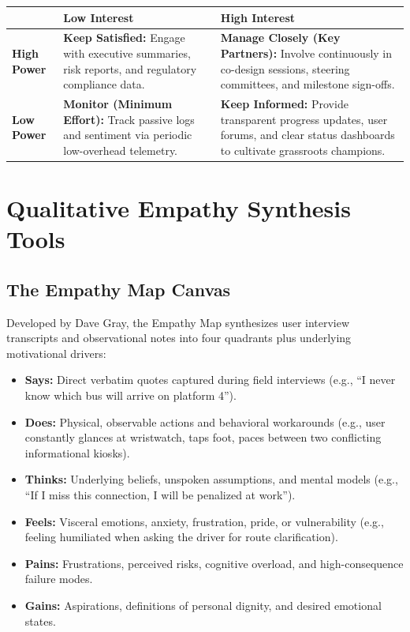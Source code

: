 \begin{methodbox}
\begin{tabularx}{\linewidth}{|l|X|X|} \hline
 & \textbf{Low Interest} & \textbf{High Interest} \\ \hline
\textbf{High Power} & \textbf{Keep Satisfied:} Engage with executive summaries, risk reports, and regulatory compliance data. & \textbf{Manage Closely (Key Partners):} Involve continuously in co-design sessions, steering committees, and milestone sign-offs. \\ \hline
\textbf{Low Power} & \textbf{Monitor (Minimum Effort):} Track passive logs and sentiment via periodic low-overhead telemetry. & \textbf{Keep Informed:} Provide transparent progress updates, user forums, and clear status dashboards to cultivate grassroots champions. \\ \hline
\end{tabularx}
\end{methodbox}

\section{Qualitative Empathy Synthesis Tools}

\subsection{The Empathy Map Canvas}
Developed by Dave Gray, the Empathy Map synthesizes user interview transcripts and observational notes into four quadrants plus underlying motivational drivers:
\begin{itemize}
    \item \textbf{Says:} Direct verbatim quotes captured during field interviews (e.g., ``I never know which bus will arrive on platform 4'').
    \item \textbf{Does:} Physical, observable actions and behavioral workarounds (e.g., user constantly glances at wristwatch, taps foot, paces between two conflicting informational kiosks).
    \item \textbf{Thinks:} Underlying beliefs, unspoken assumptions, and mental models (e.g., ``If I miss this connection, I will be penalized at work'').
    \item \textbf{Feels:} Visceral emotions, anxiety, frustration, pride, or vulnerability (e.g., feeling humiliated when asking the driver for route clarification).
    \item \textbf{Pains:} Frustrations, perceived risks, cognitive overload, and high-consequence failure modes.
    \item \textbf{Gains:} Aspirations, definitions of personal dignity, and desired emotional states.
\end{itemize}

